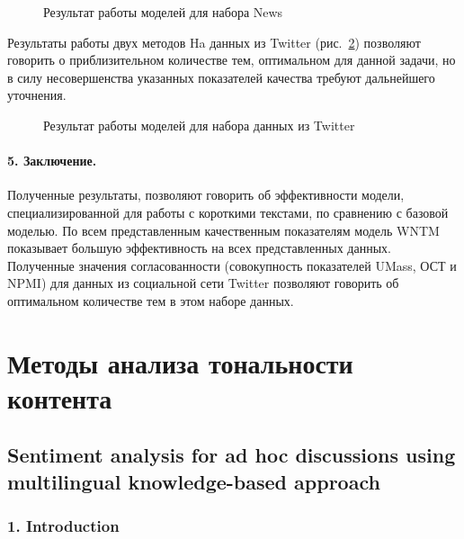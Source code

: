 \begin{figure}[ht]
	\caption{Результат работы моделей для набора News}\label{fig:newsModelResults}
\end{figure}

Результаты работы двух методов Ha данных из Twitter (рис.~\cref{fig:twitterModelResults}) позволяют говорить о приблизительном количестве тем, оптимальном для данной задачи, но в силу несовершенства указанных показателей качества требуют дальнейшего уточнения.

\begin{figure}[ht]
	\caption{Результат работы моделей для набора данных из Twitter}\label{fig:twitterModelResults}
\end{figure}

\paragraph{5. Заключение.} Полученные результаты, позволяют говорить об эффективности модели, специализированной для работы с короткими текстами, по сравнению с базовой моделью. По всем представленным качественным показателям модель WNTM показывает большую эффективность на всех представленных данных. Полученные значения согласованности (совокупность показателей UMass, ОСТ и NPMI) для данных из социальной сети Twitter позволяют говорить об оптимальном количестве тем в этом наборе данных.

\section{Методы анализа тональности контента}\label{sec:ch5/sect3}

\subsection{Sentiment analysis for ad hoc discussions using multilingual knowledge-based approach}\label{subsec:ch5/sec3/sub1}

\subsubsection{1. Introduction}

